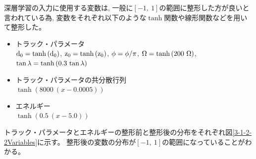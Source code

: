 深層学習の入力に使用する変数は, 一般に$[-1,\ 1]$の範囲に整形した方が良いと言われている為, 変数をそれぞれ以下のような$\tanh$関数や線形関数などを用いて整形した。

\begin{itemize}
 \item トラック・パラメータ\\
 ${\rm d_0} = \tanh{({\rm d_0})}$,
 ${\rm z_0} = \tanh{({\rm z_0})}$,
 ${\rm \phi} = {\rm \phi}/\pi$,
 ${\rm \Omega} = \tanh{(200\ {\rm \Omega})}$,
 ${\rm \tan{\lambda}} = \tanh{(0.3\ {\rm \tan{\lambda}})}$
 \item トラック・パラメータの共分散行列\\
 $\tanh{(8000\ (x-0.0005))}$
 \item エネルギー\\
 $\tanh{(0.5\ (x-5.0))}$
\end{itemize}

トラック・パラメータとエネルギーの整形前と整形後の分布をそれぞれ図\ref{3-1-2-2Variables}に示す。
整形後の変数の分布が$[-1,\ 1]$の範囲になっていることがわかる。

